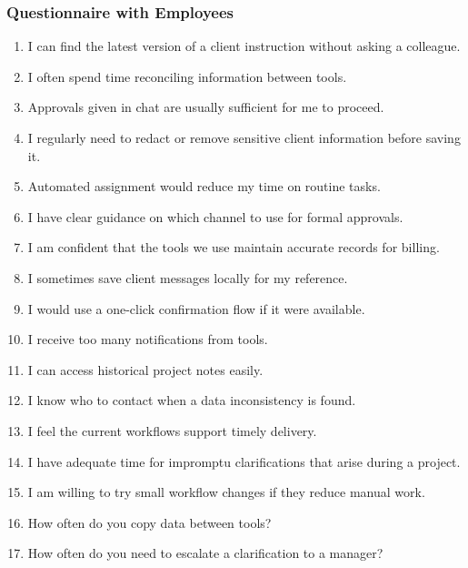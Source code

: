 \documentclass[12pt,a4paper]{report}
\begin{document}
\subsubsection{Questionnaire with Employees}
\begin{enumerate}[leftmargin=2em]
    \item I can find the latest version of a client instruction without asking a colleague.
    \item I often spend time reconciling information between tools.
    \item Approvals given in chat are usually sufficient for me to proceed.
    \item I regularly need to redact or remove sensitive client information before saving it.
    \item Automated assignment would reduce my time on routine tasks.
    \item I have clear guidance on which channel to use for formal approvals.
    \item I am confident that the tools we use maintain accurate records for billing.
    \item I sometimes save client messages locally for my reference.
    \item I would use a one-click confirmation flow if it were available.
    \item I receive too many notifications from tools.
    \item I can access historical project notes easily.
    \item I know who to contact when a data inconsistency is found.
    \item I feel the current workflows support timely delivery.
    \item I have adequate time for impromptu clarifications that arise during a project.
    \item I am willing to try small workflow changes if they reduce manual work.
    \item How often do you copy data between tools?
    \item How often do you need to escalate a clarification to a manager?
\end{enumerate}
\end{document}
